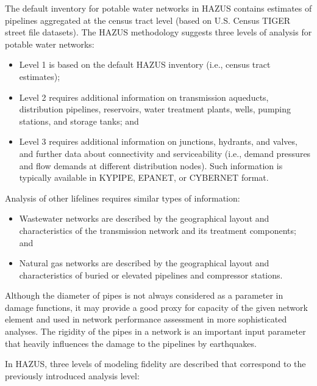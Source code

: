 The default inventory for potable water networks in HAZUS contains estimates of pipelines aggregated at the census tract level (based on U.S. Census TIGER street file datasets). The HAZUS methodology suggests three levels of analysis for potable water networks:

\begin{itemize}
    \item Level 1 is based on the default HAZUS inventory (i.e., census tract estimates);

    \item Level 2 requires additional information on transmission aqueducts, distribution pipelines, reservoirs, water treatment plants, wells, pumping stations, and storage tanks; and 

    \item Level 3 requires additional information on junctions, hydrants, and valves, and further data about connectivity and serviceability (i.e., demand pressures and flow demands at different distribution nodes). Such information is typically available in KYPIPE, EPANET, or CYBERNET format.
\end{itemize}

\noindent Analysis of other lifelines requires similar types of information:

\begin{itemize}
    \item Wastewater networks are described by the geographical layout and characteristics of the transmission network and its treatment components; and
    
    \item Natural gas networks are described by the geographical layout and characteristics of buried or elevated pipelines and compressor stations.
\end{itemize}

Although the diameter of pipes is not always considered as a parameter in damage functions, it may provide a good proxy for capacity of the given network element and used in network performance assessment in more sophisticated analyses. The rigidity of the pipes in a network is an important input parameter that heavily influences the damage to the pipelines by earthquakes. 

\noindent In HAZUS, three levels of modeling fidelity are described that correspond to the previously introduced analysis level: 


